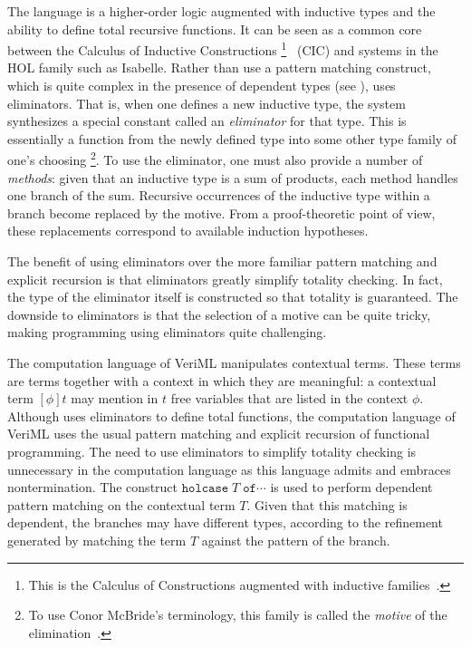 The language \lhol{} is a higher-order logic augmented with inductive types and
the ability to define total recursive functions.
It can be seen as a common core between the Calculus of Inductive
Constructions%
\footnote{%
  This is the Calculus of Constructions augmented with inductive
  families~\cite{dybjer-inductive}. %
}~\cite{cic} (CIC) and systems in the HOL family such as Isabelle.
Rather than use a pattern matching construct, which is quite complex in the
presence of dependent types (see \cite{goguen-eliminating-2006}), \lhol{} uses
eliminators.
That is, when one defines a new inductive type, the system synthesizes a special
constant called an \emph{eliminator} for that type. This is essentially a
function from the newly defined type into some other type family of one's
choosing%
\footnote{%
  To use Conor McBride's terminology, this family is called the \emph{motive} of
  the elimination~\cite{mcbride-elimination-2002}.%
}.
To use the eliminator, one must also provide a number of \emph{methods}: given
that an inductive type is a sum of products, each method handles one branch of
the sum. Recursive occurrences of the inductive type within a branch become
replaced by the motive. From a proof-theoretic point of view, these replacements
correspond to available induction hypotheses.

The benefit of using eliminators over the more familiar pattern matching and
explicit recursion is that eliminators greatly simplify totality checking.
In fact, the type of the eliminator itself is constructed so that totality is
guaranteed.
The downside to eliminators is that the selection of a motive can be quite
tricky, making programming using eliminators quite challenging.

The computation language of VeriML manipulates contextual \lhol{} terms.
These terms are \lhol{} terms together with a context in which they are
meaningful:
a contextual term $[\phi] t$ may mention in $t$ free variables that are listed
in the context $\phi$.
Although \lhol{} uses eliminators to define total functions, the computation
language of VeriML uses the usual pattern matching and explicit recursion of
functional programming.
The need to use eliminators to simplify totality checking is unnecessary in the
computation language as this language admits and embraces nontermination.
The construct $\mathtt{holcase}\;T\;\mathtt{of}\cdots$ is used to perform
dependent pattern matching on the contextual \lhol{} term $T$.
Given that this matching is dependent, the branches may have different types,
according to the refinement generated by matching the term $T$ against the
pattern of the branch.

